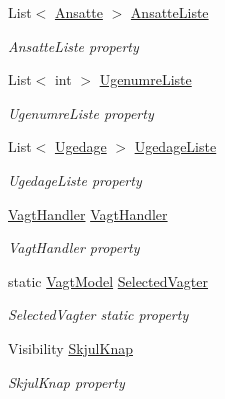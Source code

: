 \begin{DoxyCompactItemize}
List$<$ \hyperlink{class__1aarsproeve_1_1_model_1_1_ansatte}{Ansatte} $>$ \hyperlink{class__1aarsproeve_1_1_view_model_1_1_vagtplan_view_model_a0b9bae0b2b02b911646cfa98f2d5a6e8}{Ansatte\+Liste}
\begin{DoxyCompactList}\small\item\em Ansatte\+Liste property \end{DoxyCompactList}\item 
List$<$ int $>$ \hyperlink{class__1aarsproeve_1_1_view_model_1_1_vagtplan_view_model_af852f26329ee256810f5fb02f8c5ac1d}{Ugenumre\+Liste}
\begin{DoxyCompactList}\small\item\em Ugenumre\+Liste property \end{DoxyCompactList}\item 
List$<$ \hyperlink{class__1aarsproeve_1_1_model_1_1_ugedage}{Ugedage} $>$ \hyperlink{class__1aarsproeve_1_1_view_model_1_1_vagtplan_view_model_a288c70ed7f7ad254c50079c4fc33b855}{Ugedage\+Liste}
\begin{DoxyCompactList}\small\item\em Ugedage\+Liste property \end{DoxyCompactList}\item 
\hyperlink{class__1aarsproeve_1_1_handler_1_1_vagt_handler}{Vagt\+Handler} \hyperlink{class__1aarsproeve_1_1_view_model_1_1_vagtplan_view_model_acdf9517320f79372aaed5c644df493aa}{Vagt\+Handler}
\begin{DoxyCompactList}\small\item\em Vagt\+Handler property \end{DoxyCompactList}\item 
static \hyperlink{class__1aarsproeve_1_1_model_1_1_vagt_model}{Vagt\+Model} \hyperlink{class__1aarsproeve_1_1_view_model_1_1_vagtplan_view_model_afc9b91af6d14800ca023ad17cc0809f0}{Selected\+Vagter}
\begin{DoxyCompactList}\small\item\em Selected\+Vagter static property \end{DoxyCompactList}\item 
Visibility \hyperlink{class__1aarsproeve_1_1_view_model_1_1_vagtplan_view_model_a84ab9afdefc9e4602b3f9864de570a21}{Skjul\+Knap}
\begin{DoxyCompactList}\small\item\em Skjul\+Knap property \end{DoxyCompactList}\end{DoxyCompactItemize}
